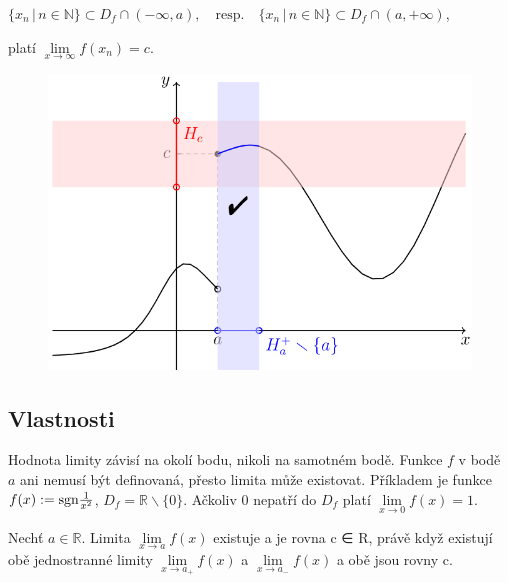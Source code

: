\documentclass{szzclass}
\begin{document}
\begin{center}
    $\{x_n\, |\, n\in\mathbb{N}\} \subset D_f \cap (-\infty,a), \quad \textrm{resp.} \quad \{x_n\, |\, n\in\mathbb{N}\} \subset D_f \cap (a,+\infty)$,
\end{center}
  
platí  
$\lim\limits_{x \rightarrow \infty} f(x_n) = c$.



\begin{figure}[h]
    \includegraphics[width=.6\textwidth, center]{topics/bi-spol-34/images/jed_lim.png}
\end{figure}


\subsection{Vlastnosti}
Hodnota limity závisí na okolí bodu, nikoli na samotném bodě. Funkce $f$ v bodě $a$
ani nemusí být definovaná, přesto limita může existovat. Příkladem je funkce 
$f(x)\nolinebreak :=\nolinebreak \text{sgn} \frac{1}{x^2}$,
$D_f = \mathbb{R} \backslash \{0\}$.
Ačkoliv $0$ nepatří do $D_f$ platí $\lim\limits_{x\to 0} f(x) = 1$.

Nechť $a \in \mathbb{R}$. Limita $\lim\limits_{x \rightarrow a} f(x)$ existuje a je rovna c ∈ R, právě když existují obě
jednostranné limity $\lim\limits_{x \rightarrow a_+} f(x)$ a $\lim\limits_{x \rightarrow a_-} f(x)$ a obě jsou rovny c. 
\end{document}
